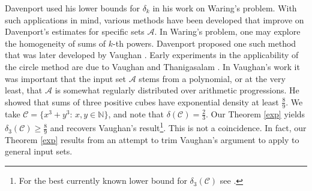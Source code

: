 \documentclass[reqno]{amsart}
\numberwithin{equation}{section}
\begin{document}
Davenport used his lower bounds for $\delta_k$ in his work on Waring's problem. With such applications in mind, various methods have been developed that improve on Davenport's estimates for specific sets $\mathscr A$. In Waring's problem, one may explore the homogeneity of sums of $k$-th powers. Davenport \cite[Theorem 4]{D} proposed one such method that was later developed by Vaughan \cite{V86,V89}. Early experiments in the applicability of the circle method  are due to Vaughan \cite{V85} and Thanigasalam \cite{T}. In Vaughan's work it was important that the input set $\mathscr A$ stems from a polynomial, or at the very least, that $\mathscr A$ is somewhat regularly distributed over arithmetic progressions. He showed that sums of three positive cubes have exponential density at least $\frac89$. We take $\mathscr C = \{x^3+y^3: \, x,y\in\mathbb N\}$, and note that $\delta(\mathscr C)=\frac23$. Our Theorem \ref{exp} yields  $\delta_3(\mathscr C)\ge\frac89$ and recovers Vaughan's result\footnote{For the best currently known lower bound for $\delta_3(\mathscr C)$ see \cite{WW}.}. This is not a coincidence. In fact, our Theorem \ref{exp} results from an attempt to trim Vaughan's argument to apply to general input sets. 
\end{document}
